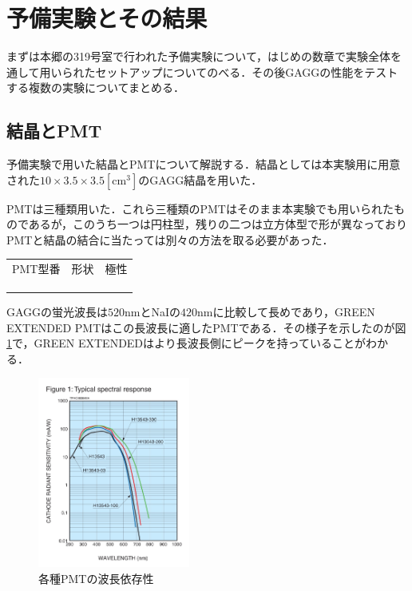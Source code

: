 \documentclass[a4j]{jarticle}
\begin{document}
\section{予備実験とその結果}
まずは本郷の319号室で行われた予備実験について，はじめの数章で実験全体を通して用いられたセットアップについてのべる．その後GAGGの性能をテストする複数の実験についてまとめる．

\subsection{結晶とPMT}
予備実験で用いた結晶とPMTについて解説する．結晶としては本実験用に用意された$10\times 3.5 \times 3.5 \mathrm{[cm^3]}$のGAGG結晶を用いた．


PMTは三種類用いた．これら三種類のPMTはそのまま本実験でも用いられたものであるが，このうち一つは円柱型，残りの二つは立方体型で形が異なっておりPMTと結晶の結合に当たっては別々の方法を取る必要があった．
\begin{table}[htb]
 \centering
 \begin{tabular}{|c|c|c|}
  PMT型番&形状 &極性 \\
  & & \\
  & & \\
  & & \\
 \end{tabular}
\end{table}
GAGGの蛍光波長は$520$nmとNaIの$420$nmに比較して長めであり，GREEN EXTENDED PMTはこの長波長に適したPMTである．その様子を示したのが図\ref{032823_3Sep18}で，GREEN EXTENDEDはより長波長側にピークを持っていることがわかる．
\begin{figure}[htb]
 \centering
 \includegraphics[bb=0 0 1095 1371,width=5cm]{PMTgreen.jpg}
 \caption{各種PMTの波長依存性}
 \label{032823_3Sep18}
\end{figure}
\end{document}
